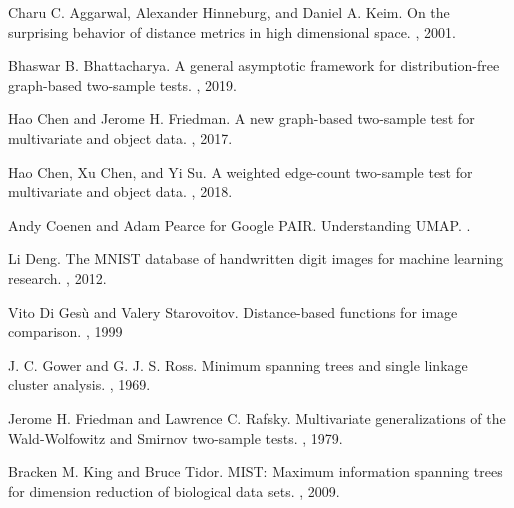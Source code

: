 \documentclass{article}
\begin{document}
\begin{thebibliography}{10}

Charu C. Aggarwal, Alexander Hinneburg, and Daniel A. Keim.
\newblock On the surprising behavior of distance metrics in high dimensional space.
, 2001.

Bhaswar B. Bhattacharya.
\newblock A general asymptotic framework for distribution-free graph-based two-sample tests.
, 2019.

Hao Chen and Jerome H. Friedman.
\newblock A new graph-based two-sample test for multivariate and object data.
, 2017.

Hao Chen, Xu Chen, and Yi Su.
\newblock A weighted edge-count two-sample test for multivariate and object data.
, 2018.

Andy Coenen and Adam Pearce for Google PAIR.
\newblock Understanding UMAP.
.

Li Deng.
\newblock The MNIST database of handwritten digit images for machine learning research.
, 2012.

Vito Di Ges\`u and Valery Starovoitov.
\newblock Distance-based functions for image comparison.
, 1999

J. C. Gower and G. J. S. Ross.
\newblock Minimum spanning trees and single linkage cluster analysis.
, 1969.

Jerome H. Friedman and Lawrence C. Rafsky.
\newblock Multivariate generalizations of the Wald-Wolfowitz and Smirnov two-sample tests.
, 1979.

Bracken M. King and Bruce Tidor.
\newblock MIST: Maximum information spanning trees for dimension reduction of biological data sets.
, 2009.


\end{thebibliography}
\end{document}
